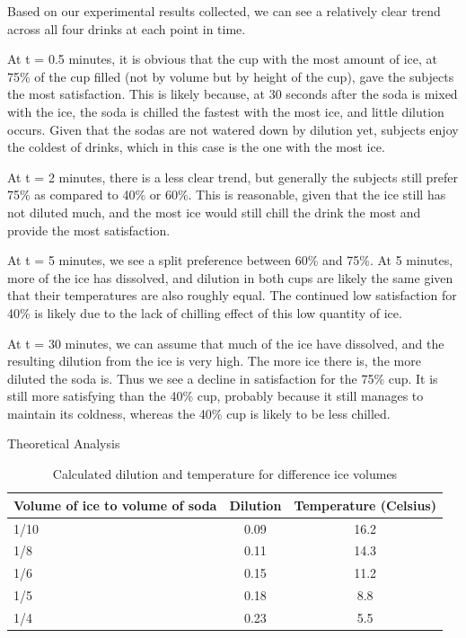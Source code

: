 \documentclass[oneside,12pt]{report}
\begin{document}
\vspace{6pt}
Based on our experimental results collected, we can see a relatively clear trend across all four drinks at each point in time. 

\vspace{6pt}
At t = 0.5 minutes, it is obvious that the cup with the most amount of ice, at 75\% of the cup filled (not by volume but by height of the cup), gave the subjects the most satisfaction. This is likely because, at 30 seconds after the soda is mixed with the ice, the soda is chilled the fastest with the most ice, and little dilution occurs. Given that the sodas are not watered down by dilution yet, subjects enjoy the coldest of drinks, which in this case is the one with the most ice. 

\vspace{6pt}
At t = 2 minutes, there is a less clear trend, but generally the subjects still prefer 75\% as compared to 40\% or 60\%. This is reasonable, given that the ice still has not diluted much, and the most ice would still chill the drink the most and provide the most satisfaction. 

\vspace{6pt}
At t = 5 minutes, we see a split preference between 60\% and 75\%. At 5 minutes, more of the ice has dissolved, and dilution in both cups are likely the same given that their temperatures are also roughly equal. The continued low satisfaction for 40\% is likely due to the lack of chilling effect of this low quantity of ice.

\vspace{6pt}
At t = 30 minutes, we can assume that much of the ice have dissolved, and the resulting dilution from the ice is very high. The more ice there is, the more diluted the soda is. Thus we see a decline in satisfaction for the 75\% cup. It is still more satisfying than the 40\% cup, probably because it still manages to maintain its coldness, whereas the 40\% cup is likely to be less chilled. 


\newpage
Theoretical Analysis

\begin{table}[ h]
\centering
\begin{tabular}{ l || c|c}
 Volume of ice to volume of soda &Dilution &Temperature (Celsius) \\
\hline  
1/10 & 0.09&16.2\\ 
\hline  
1/8 & 0.11&14.3\\ 
\hline 
1/6 & 0.15&11.2\\ 
\hline 
1/5 & 0.18&8.8\\ 
\hline 
1/4 & 0.23&5.5\\ 
\hline    
\end{tabular}
\caption{Calculated dilution and temperature for difference ice volumes}
\end{table}
\end{document}
